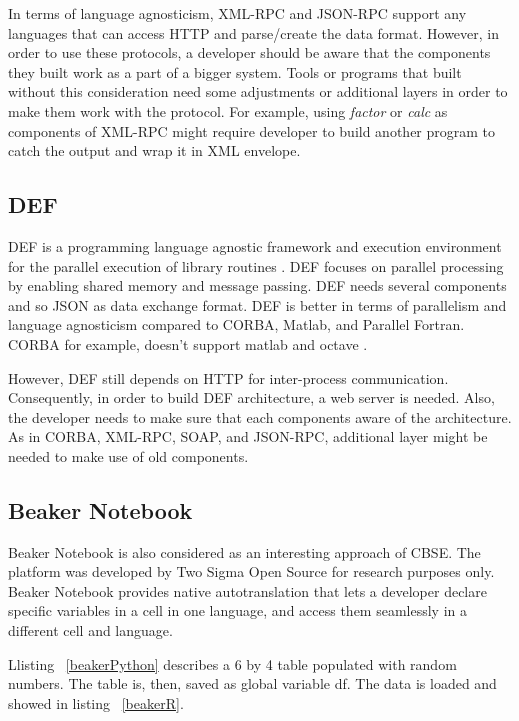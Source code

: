 \documentclass[conference]{IEEEtran}
\begin{document}
In terms of language agnosticism, XML-RPC and JSON-RPC support any languages that can
access HTTP and parse/create the data format. However, in order to use these protocols,
a developer should be aware that the components they built work as a part of a
bigger system. Tools or programs that built without this consideration need
some adjustments or additional layers in order to make them work with the protocol.
For example, using {\it{factor}} or {\it{calc}} as components of XML-RPC might require
developer to build another program to catch the output and wrap it in XML envelope.

\subsection{DEF}

DEF is a programming language agnostic framework and execution environment 
for the parallel execution of library routines \cite{feilhauer2016def}. 
DEF focuses on parallel processing by enabling shared memory and message passing. 
DEF needs several components and so JSON as data exchange format. 
DEF is better in terms of parallelism and language agnosticism compared to CORBA, Matlab, and Parallel Fortran. 
CORBA for example, doesn't support matlab and octave \cite{feilhauer2016def}. 

However, DEF still depends on HTTP for inter-process communication. Consequently, 
in order to build DEF architecture, a web server is needed. Also, the developer needs 
to make sure that each components aware of the architecture. As in CORBA, XML-RPC, 
SOAP, and JSON-RPC, additional layer might be needed to make use of old components.

\subsection{Beaker Notebook}

Beaker Notebook \cite{beakernotebook} is also considered as an interesting 
approach of CBSE. The platform was developed by Two Sigma Open Source 
for research purposes only. Beaker Notebook provides native autotranslation that 
lets a developer declare specific variables in a cell in one language, 
and access them seamlessly in a different cell and language.

Llisting ~\ref{beakerPython} describes a 6 by 4 table populated with
random numbers. The table is, then, saved as global variable df. 
The data is loaded and showed in listing ~\ref{beakerR}.
\end{document}
